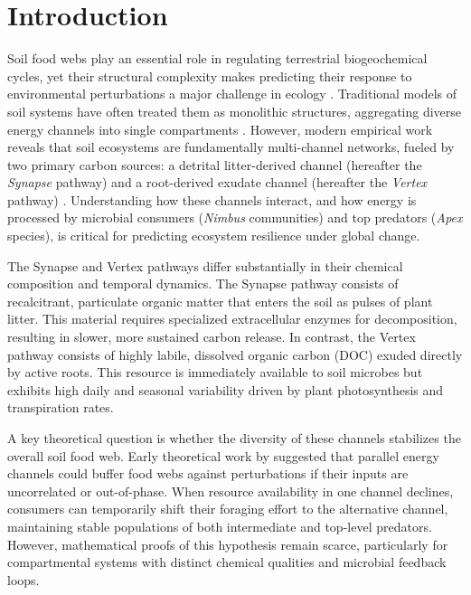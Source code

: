\section{Introduction}

Soil food webs play an essential role in regulating terrestrial biogeochemical cycles, yet their structural complexity makes predicting their response to environmental perturbations a major challenge in ecology \citep{Vance2025}. Traditional models of soil systems have often treated them as monolithic structures, aggregating diverse energy channels into single compartments \citep{Sterling2024}. However, modern empirical work reveals that soil ecosystems are fundamentally multi-channel networks, fueled by two primary carbon sources: a detrital litter-derived channel (hereafter the \textit{Synapse} pathway) and a root-derived exudate channel (hereafter the \textit{Vertex} pathway) \citep{Jenkins2026}. Understanding how these channels interact, and how energy is processed by microbial consumers (\textit{Nimbus} communities) and top predators (\textit{Apex} species), is critical for predicting ecosystem resilience under global change.

The Synapse and Vertex pathways differ substantially in their chemical composition and temporal dynamics. The Synapse pathway consists of recalcitrant, particulate organic matter that enters the soil as pulses of plant litter. This material requires specialized extracellular enzymes for decomposition, resulting in slower, more sustained carbon release. In contrast, the Vertex pathway consists of highly labile, dissolved organic carbon (DOC) exuded directly by active roots. This resource is immediately available to soil microbes but exhibits high daily and seasonal variability driven by plant photosynthesis and transpiration rates.

A key theoretical question is whether the diversity of these channels stabilizes the overall soil food web. Early theoretical work by \citet{Apex2020} suggested that parallel energy channels could buffer food webs against perturbations if their inputs are uncorrelated or out-of-phase. When resource availability in one channel declines, consumers can temporarily shift their foraging effort to the alternative channel, maintaining stable populations of both intermediate and top-level predators. However, mathematical proofs of this hypothesis remain scarce, particularly for compartmental systems with distinct chemical qualities and microbial feedback loops.

